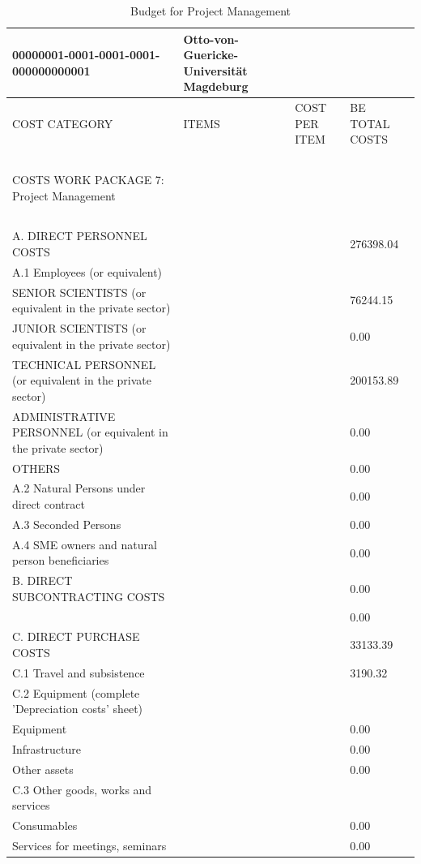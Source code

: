 \begin{table}[H]
\centering
\caption{Budget for Project Management}
\begin{tabular}{|l|l|l|l|}
\hline
00000001-0001-0001-0001-000000000001 & Otto-von-Guericke-Universität Magdeburg & ~ & ~ \\ \hline
COST CATEGORY & ITEMS & COST PER ITEM & BE TOTAL COSTS \\ \hline
~ & ~ & ~ & ~ \\ \hline
COSTS WORK PACKAGE 7: Project Management & ~ & ~ & ~ \\ \hline
~ & ~ & ~ & ~ \\ \hline
A. DIRECT PERSONNEL COSTS & ~ & ~ & 276398.04 \\ \hline
A.1 Employees (or equivalent) & ~ & ~ & ~ \\ \hline
SENIOR SCIENTISTS (or equivalent in the private sector) & ~ & ~ & 76244.15 \\ \hline
JUNIOR SCIENTISTS (or equivalent in the private sector) & ~ & ~ & 0.00 \\ \hline
TECHNICAL PERSONNEL (or equivalent in the private sector) & ~ & ~ & 200153.89 \\ \hline
ADMINISTRATIVE PERSONNEL (or equivalent in the private sector) & ~ & ~ & 0.00 \\ \hline
OTHERS & ~ & ~ & 0.00 \\ \hline
A.2 Natural Persons under direct contract & ~ & ~ & 0.00 \\ \hline
A.3 Seconded Persons & ~ & ~ & 0.00 \\ \hline
A.4 SME owners and natural person beneficiaries & ~ &  & 0.00 \\ \hline
B. DIRECT SUBCONTRACTING COSTS & ~ & ~ & 0.00\\ \hline
~ & ~ & ~ & 0.00 \\ \hline
C. DIRECT PURCHASE COSTS & ~ & ~ & 33133.39 \\ \hline
C.1 Travel and subsistence & ~ &  & 3190.32 \\ \hline
C.2 Equipment (complete 'Depreciation costs' sheet) & ~ & ~ & ~ \\ \hline
Equipment & ~ &  & 0.00 \\ \hline
Infrastructure & ~ &  & 0.00 \\ \hline
Other assets & ~ &  & 0.00 \\ \hline
C.3 Other goods, works and services & ~ & ~ & ~ \\ \hline
Consumables & ~ &  & 0.00 \\ \hline
Services for meetings, seminars & ~ & ~ & 0.00 \\ \hline

\end{tabular}
\end{table}
